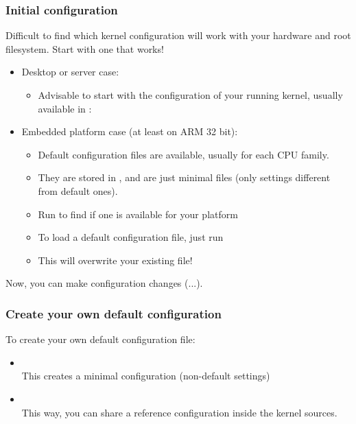 \begin{frame}
  \frametitle{Initial configuration}
  Difficult to find which kernel configuration will work
  with your hardware and root filesystem. Start with one
  that works!
  \begin{itemize}
  \item Desktop or server case:
     \begin{itemize}
       \item Advisable to start with the configuration of your running
	  kernel, usually available in :\\
     \end{itemize}
  \item Embedded platform case (at least on ARM 32 bit):
     \begin{itemize}
	\item Default configuration files are available, usually for
	  each CPU family.
        \item They are stored in , and are
          just minimal  files (only settings different
          from default ones).
        \item Run  to find if one is available for your
          platform
        \item To load a default configuration file, just run\\
        \item This will overwrite your existing  file!
     \end{itemize}
  \end{itemize}
  Now, you can make configuration changes (...).
\end{frame}

\begin{frame}
  \frametitle{Create your own default configuration}
  To create your own default configuration file:
  \begin{itemize}
     \item {}\\
       This creates a minimal configuration (non-default settings)
     \item {}\\
       This way, you can share a reference configuration inside
       the kernel sources.
  \end{itemize}
\end{frame}

